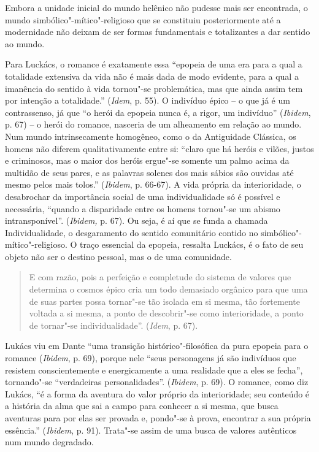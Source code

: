 Embora a unidade inicial do mundo helênico não pudesse mais ser
encontrada, o mundo simbólico"-mítico"-religioso que se constituiu
posteriormente até a modernidade não deixam de ser formas fundamentais e
totalizantes a dar sentido ao mundo.

Para Luckács, o romance é exatamente essa ``epopeia de uma era para a
qual a totalidade extensiva da vida não é mais dada de modo evidente,
para a qual a imanência do sentido à vida tornou"-se problemática, mas
que ainda assim tem por intenção a totalidade.'' (\emph{Idem}, p. 55). O
indivíduo épico -- o que já é um contrassenso, já que ``o herói da
epopeia nunca é, a rigor, um indivíduo'' (\emph{Ibidem}, p. 67) -- o
herói do romance, nasceria de um alheamento em relação ao mundo. Num
mundo intrinsecamente homogêneo, como o da Antiguidade Clássica, os
homens não diferem qualitativamente entre si: ``claro que há heróis e
vilões, justos e criminosos, mas o maior dos heróis ergue"-se somente um
palmo acima da multidão de seus pares, e as palavras solenes dos mais
sábios são ouvidas até mesmo pelos mais tolos.'' (\emph{Ibidem}, p.
66-67). A vida própria da interioridade, o desabrochar da importância
social de uma individualidade só é possível e necessária, ``quando a
disparidade entre os homens tornou"-se um abismo intransponível''.
(\emph{Ibidem,} p. 67). Ou seja, é aí que se funda a chamada
Individualidade, o desgaramento do sentido comunitário contido no
simbólico"-mítico"-religioso. O traço essencial da epopeia, ressalta
Luckács, é o fato de seu objeto não ser o destino pessoal, mas o de uma
comunidade.

\begin{quote}
E com razão, pois a perfeição e completude do sistema de valores que
determina o cosmos épico cria um todo demasiado orgânico para que uma de
suas partes possa tornar"-se tão isolada em si mesma, tão fortemente
voltada a si mesma, a ponto de descobrir"-se como interioridade, a ponto
de tornar"-se individualidade''. (\emph{Idem}, p. 67).
\end{quote}

Lukács viu em Dante ``uma transição histórico"-filosófica da pura epopeia
para o romance (\emph{Ibidem}, p. 69), porque nele ``seus personagens já
são indivíduos que resistem conscientemente e energicamente a uma
realidade que a eles se fecha'', tornando"-se ``verdadeiras
personalidades''. (\emph{Ibidem}, p. 69). O romance, como diz Lukács,
``é a forma da aventura do valor próprio da interioridade; seu conteúdo
é a história da alma que sai a campo para conhecer a si mesma, que busca
aventuras para por elas ser provada e, pondo"-se à prova, encontrar a sua
própria essência.'' (\emph{Ibidem}, p. 91). Trata"-se assim de uma busca
de valores autênticos num mundo degradado.

